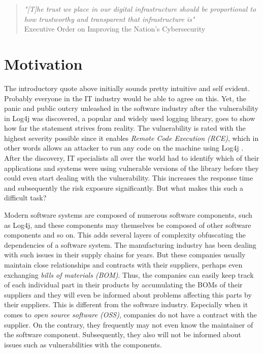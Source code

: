 
\pagestyle{fancy-style}

\begin{quote}
	\emph{"[T]he trust we place in our digital infrastructure should be proportional to how trustworthy and transparent that infrastructure is"}\\
	Executive Order on Improving the Nation's Cybersecurity \cite{ExecutiveOrderSBOM}
\end{quote}

\section{Motivation}
The introductory quote above initially sounds pretty intuitive and self evident. Probably everyone in the IT industry would be able to agree on this. Yet, the panic and public outcry unleashed in the software industry after the vulnerability in Log4j was discovered, a popular and widely used logging library, goes to show how far the statement strives from reality. The vulnerability is rated with the highest severity possible since it enables \textit{Remote Code Execution (RCE)}, which in other words allows an attacker to run any code on the machine using Log4j \cite{Log4jVuln}. After the discovery, IT specialists all over the world had to identify which of their applications and systems were using vulnerable versions of the library before they could even start dealing with the vulnerability. This increases the response time and subsequently the risk exposure significantly. But what makes this such a difficult task?\par
Modern software systems are composed of numerous software components, such as Log4j, and these components may themselves be composed of other software components and so on. This adds several layers of complexity obfuscating the dependencies of a software system. The manufacturing industry has been dealing with such issues in their supply chains for years. But these companies usually maintain close relationships and contracts with their suppliers, perhaps even exchanging \textit{bills of materials (BOM)}. Thus, the companies can easily keep track of each individual part in their products by accumulating the BOMs of their suppliers and they will even be informed about problems affecting this parts by their suppliers. This is different from the software industry. Especially when it comes to \textit{open source software (OSS)}, companies do not have a contract with the supplier. On the contrary, they frequently may not even know the maintainer of the software component. Subsequently, they also will not be informed about issues such as vulnerabilities with the components.\par

